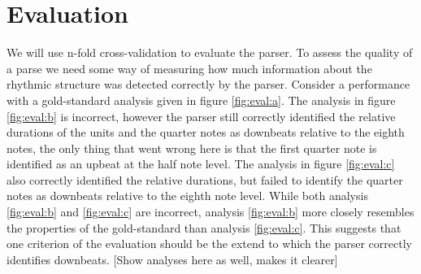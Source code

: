 \section{Evaluation}
\label{sec:evaluation}




We will use n-fold cross-validation to evaluate the parser. To assess the quality of a parse we need some way of measuring how much information about the rhythmic structure was detected correctly by the parser.  Consider a performance with a gold-standard analysis given in figure \ref{fig:eval:a}. The analysis in figure \ref{fig:eval:b} is incorrect, however the parser still correctly identified the relative durations of the units and the quarter notes as downbeats relative to the eighth notes, the only thing that went wrong here is that the first quarter note is identified as an upbeat at the half note level. The analysis in figure \ref{fig:eval:c} also correctly identified the relative durations, but failed to identify the quarter notes as downbeats relative to the eighth note level. While both analysis \ref{fig:eval:b} and \ref{fig:eval:c} are incorrect, analysis \ref{fig:eval:b} more closely resembles the properties of the gold-standard than analysis \ref{fig:eval:c}. This suggests that one criterion of the evaluation should be the extend to which the parser correctly identifies downbeats.  [Show analyses here as well, makes it clearer]
